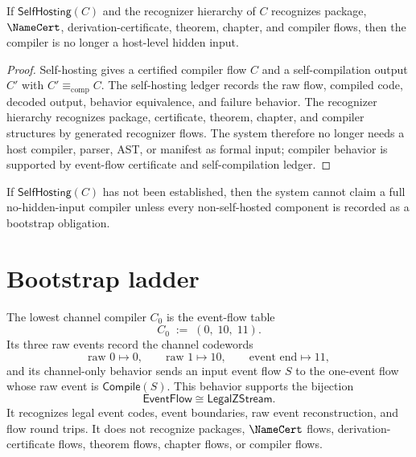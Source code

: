 \begin{theorem}
\label{thm:self-hosting-compiler-removes-hidden-input}
If $\mathsf{SelfHosting}(C)$ and the recognizer hierarchy of $C$ recognizes package, $\NameCert$, derivation-certificate, theorem, chapter, and compiler flows, then the compiler is no longer a host-level hidden input.
\end{theorem}

\begin{proof}
Self-hosting gives a certified compiler flow $C$ and a self-compilation output $C'$ with $C'\equiv_{\mathrm{comp}}C$. The self-hosting ledger records the raw flow, compiled code, decoded output, behavior equivalence, and failure behavior. The recognizer hierarchy recognizes package, certificate, theorem, chapter, and compiler structures by generated recognizer flows. The system therefore no longer needs a host compiler, parser, AST, or manifest as formal input; compiler behavior is supported by event-flow certificate and self-compilation ledger.
\end{proof}

\begin{corollary}
\label{cor:self-hosting-compiler-full-claim-requires-boundary}
If $\mathsf{SelfHosting}(C)$ has not been established, then the system cannot claim a full no-hidden-input compiler unless every non-self-hosted component is recorded as a bootstrap obligation.
\end{corollary}

\section{Bootstrap ladder}
\label{sec:self-hosting-compiler-bootstrap-ladder}

\begin{definition}
\label{def:self-hosting-compiler-channel-compiler}
The lowest channel compiler $C_0$ is the event-flow table
$$
  C_0 \;:=\; (0,\;10,\;11).
$$
Its three raw events record the channel codewords
$$
  \text{raw }0\mapsto 0,\qquad
  \text{raw }1\mapsto 10,\qquad
  \text{event end}\mapsto 11,
$$
and its channel-only behavior sends an input event flow $S$ to the one-event
flow whose raw event is $\mathsf{Compile}(S)$. This behavior supports the
bijection
$$
  \mathsf{EventFlow}\cong\mathsf{LegalZStream}.
$$
It recognizes legal event codes, event boundaries, raw event reconstruction, and flow round trips. It does not recognize packages, $\NameCert$ flows, derivation-certificate flows, theorem flows, chapter flows, or compiler flows.
\end{definition}

